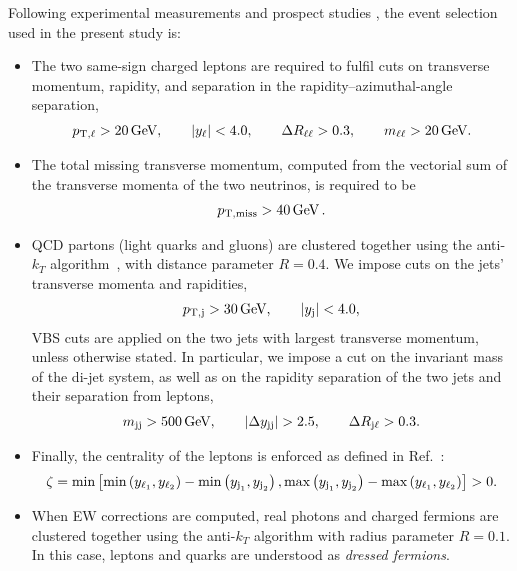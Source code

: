 \documentclass[11pt,epsf]{article}
\begin{document}
    Following experimental measurements \cite{Aad:2014zda,Aaboud:2016ffv,Khachatryan:2014sta,CMS:2017adb} and prospect studies \cite{ATL-PHYS-PUB-2017-023}, the event selection used in the present study is:

    \begin{itemize}
        \item The two same-sign charged leptons are required to fulfil cuts on transverse momentum, rapidity, and separation in the rapidity--azimuthal-angle separation, 
            \begin{align}
            \label{cut:1}
             p_{\text{T},\ell} >  20\,\text{GeV},\qquad |y_{\ell}| < 4.0, \qquad \Delta R_{\ell\ell}> 0.3, \qquad m_{\ell\ell}>20\,\text{GeV}.
            \end{align}
        \item The total missing transverse momentum, computed from the vectorial sum of the transverse momenta of the two neutrinos, is required to be
            \begin{align}
            \label{cut:2}
              p_{\rm T, miss} >  40\,\text{GeV}\,.
            \end{align}
        \item QCD partons (light quarks and gluons) are clustered together using the anti-$k_T$ algorithm~\cite{Cacciari:2008gp}, with distance parameter $R=0.4$.
        We impose cuts on the jets' transverse momenta and rapidities,  
            \begin{align}
            \label{cut:3}
             p_{\text{T},\text{j}} >  30\,\text{GeV}, \qquad |y_\text{j}| < 4.0, 
            \end{align}
            VBS cuts are applied on the two jets with largest transverse momentum, unless otherwise stated. In particular, we impose a cut on the 
             in\-vari\-ant mass of the di-jet system, as well as on the rapidity separation of the two jets and their separation from leptons,
            \begin{align}
            \label{cut:4}
             m_{\text{j} \text{j}} >  500\,\text{GeV},\qquad |\Delta y_{\text{j} \text{j}}| > 2.5, \qquad \Delta R_{\text{j}\ell} > 0.3 .
            \end{align}
        \item Finally, the centrality of the leptons is enforced as defined in Ref.~\cite{ATL-PHYS-PUB-2017-023}:
            \begin{align}
            \label{cut:5}
             \zeta = \text{min}\left[\text{min}\left(y_{\ell_1},y_{\ell_2}\right) - \text{min}\left(y_{\text{j}_1},y_{\text{j}_2}\right), \text{max}\left(y_{\text{j}_1},y_{\text{j}_2}\right) - \text{max}\left(y_{\ell_1},y_{\ell_2}\right)\right]> 0 .
            \end{align}
            
        \item When EW corrections are computed, real photons and charged fermions are clustered together using the anti-$k_T$ algorithm with
            radius parameter $R=0.1$. In this case, leptons and quarks are understood as {\it dressed fermions}.
    \end{itemize}
\end{document}
